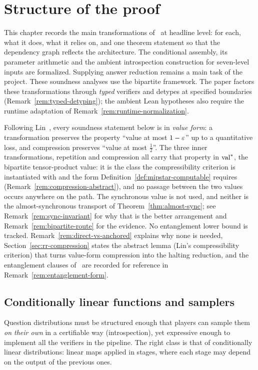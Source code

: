 \section{Structure of the proof}
\label{ch:proof-structure}

This chapter records the main transformations of~\cite{JNVWY20} at headline level: for
each, what it does, what it relies on, and one theorem statement so that the dependency
graph reflects the architecture. The conditional assembly, its parameter arithmetic
and the ambient introspection construction for seven-level inputs are formalized.
Supplying answer reduction remains a main task of the project. These soundness
analyses use the bipartite framework.
The paper factors these transformations through \emph{typed} verifiers and detypes at
specified boundaries (Remark~\ref{rem:typed-detyping}); the ambient Lean hypotheses
also require the runtime adaptation of Remark~\ref{rem:runtime-normalization}.

Following Lin~\cite{Lin25}, every soundness statement below is in \emph{value form}: a
transformation preserves the property ``value at most $1 - \varepsilon$'' up to a quantitative
loss, and compression preserves ``value at most $\frac12$''. The three inner
transformations, repetition and compression all carry that property in $\mathrm{val}^*$, the
bipartite tensor-product value: it is the class the compressibility criterion is
instantiated with and the form Definition~\ref{def:mipstar-computable} requires
(Remark~\ref{rem:compression-abstract}), and no passage between the two values occurs
anywhere on the path. The synchronous value is not used, and neither is the
almost-synchronous transport of Theorem~\ref{thm:almost-sync}; see
Remark~\ref{rem:sync-invariant} for why that is the better arrangement and
Remark~\ref{rem:bipartite-route} for the evidence. No entanglement lower bound is tracked. Remark~\ref{rem:direct-vs-anchored} explains why none is needed,
Section~\ref{sec:rr-compression} states the abstract lemma (Lin's compressibility
criterion) that turns value-form compression into the halting reduction, and the
entanglement clauses of~\cite{JNVWY20} are recorded for reference in
Remark~\ref{rem:entanglement-form}.

\subsection{Conditionally linear functions and samplers}
\label{sec:ps-cl}

Question distributions must be structured enough that players can sample them
\emph{on their own} in a certifiable way (introspection), yet expressive enough to
implement all the verifiers in the pipeline. The right class is that of conditionally
linear distributions: linear maps applied in stages, where each stage may depend on
the output of the previous ones.

